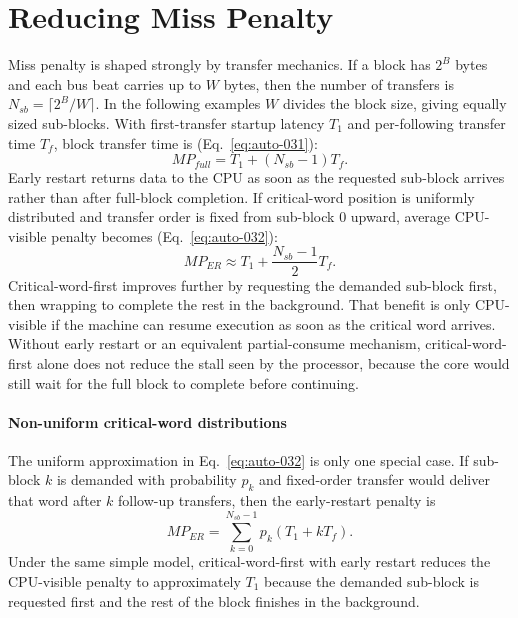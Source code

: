\section{Reducing Miss Penalty}\label{sec:auto-029}
Miss penalty is shaped strongly by transfer mechanics.
If a block has $2^B$ bytes and each bus beat carries up to $W$ bytes, then the number of transfers is $N_{sb}=\lceil 2^B/W\rceil$.
In the following examples $W$ divides the block size, giving equally sized sub-blocks.
With first-transfer startup latency $T_1$ and per-following transfer time $T_f$, block transfer time is (Eq.~\eqref{eq:auto-031}):
\begin{equation}\label{eq:auto-031}
    MP_{full} = T_1 + (N_{sb}-1)T_f.
\end{equation}
Early restart returns data to the CPU as soon as the requested sub-block arrives rather than after full-block completion.
If critical-word position is uniformly distributed and transfer order is fixed from sub-block 0 upward, average CPU-visible penalty becomes (Eq.~\eqref{eq:auto-032}):
\begin{equation}\label{eq:auto-032}
    MP_{ER} \approx T_1 + \frac{N_{sb}-1}{2}T_f.
\end{equation}
Critical-word-first improves further by requesting the demanded sub-block first, then wrapping to complete the rest in the background.
That benefit is only CPU-visible if the machine can resume execution as soon as the critical word arrives.
Without early restart or an equivalent partial-consume mechanism, critical-word-first alone does not reduce the stall seen by the processor, because the core would still wait for the full block to complete before continuing.

\paragraph{Non-uniform critical-word distributions}\label{par:auto-021a}
The uniform approximation in Eq.~\eqref{eq:auto-032} is only one special case.
If sub-block $k$ is demanded with probability $p_k$ and fixed-order transfer would deliver that word after $k$ follow-up transfers, then the early-restart penalty is
\begin{equation}\label{eq:auto-032a}
    MP_{ER}=\sum_{k=0}^{N_{sb}-1} p_k \left(T_1 + kT_f\right).
\end{equation}
Under the same simple model, critical-word-first with early restart reduces the CPU-visible penalty to approximately $T_1$ because the demanded sub-block is requested first and the rest of the block finishes in the background.

